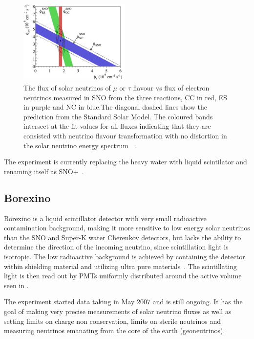 \begin{figure}[h!]
\centering
  \centering
\includegraphics[width=0.49\textwidth]{figures/fixSNO.jpeg}
\vspace{2mm}
\caption{The flux of solar neutrinos of $\mu$ or $\tau$ flavour vs flux of electron neutrinos measured in SNO from the three reactions, CC in red, ES in purple and NC in blue.The diagonal dashed lines show the prediction from the Standard Solar Model. The coloured bands intersect at the fit values for all fluxes indicating that they are consisted with neutrino flavour transformation with no distortion in the solar neutrino energy spectrum ~\cite{98Ahmad}.}
\label{fig:SNO2}
\end{figure}

The experiment is currently replacing the heavy water with liquid scintilator and renaming itself as SNO+~\cite{42SNO+}.

\subsection{Borexino}
Borexino is a liquid scintillator detector with very small radioactive contamination background, making it more sensitive to low energy solar neutrinos than the SNO and Super-K water Cherenkov detectors, but lacks the ability to determine the direction of the incoming neutrino, since scintillation light is isotropic. The low radioactive background is achieved by containing the detector within shielding material and utilizing ultra pure materials~\cite{63Borexino}. The scintillating light is then read out by PMTs uniformly distributed around the active volume seen in .

The experiment started data taking in May 2007 and is still ongoing. It has the goal of making  very precise measurements of solar neutrino fluxes as well as setting limits on charge non conservation, limits on sterile neutrinos and measuring neutrinos emanating from the core of the earth (geoneutrinos).

